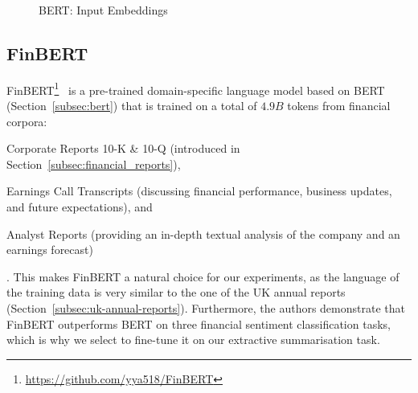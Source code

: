 \begin{figure}[ht]
    \caption{BERT: Input Embeddings}
    \label{fig:bert_input}
\end{figure}

\subsection{FinBERT}\label{subsec:finbert}
FinBERT\footnote{\url{https://github.com/yya518/FinBERT}}~\cite{yang2020finbert} is a pre-trained domain-specific language model based on
BERT~\cite{devlin-etal-2019-bert} (Section~\ref{subsec:bert}) that is trained on a total of $4.9B$ tokens from financial corpora:
\begin{enumerate*}
    \item Corporate Reports 10-K \& 10-Q (introduced in Section~\ref{subsec:financial_reports}),
    \item Earnings Call Transcripts (discussing financial performance, business updates, and future expectations), and
    \item Analyst Reports (providing an in-depth textual analysis of the company and an earnings forecast)
\end{enumerate*}.
This makes FinBERT a natural choice for our experiments, as the language of the training data is very similar to the one of the UK annual reports (Section~\ref{subsec:uk-annual-reports}).
Furthermore, the authors demonstrate that FinBERT outperforms BERT on three financial sentiment classification tasks, which is why we select to fine-tune it on our extractive summarisation task.

